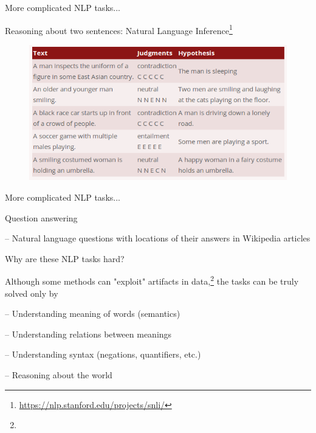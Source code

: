 \documentclass[12pt]{beamer}
\begin{document}
\begin{frame}{More complicated NLP tasks...}
	
Reasoning about two sentences: Natural Language Inference\footnote{\url{https://nlp.stanford.edu/projects/snli/}}

\begin{figure}
	\includegraphics[width=0.9\linewidth]{img/snli.png}
\end{figure}




\end{frame}


\begin{frame}{More complicated NLP tasks...}
	

	Question answering
	
	-- Natural language questions with locations of their answers in Wikipedia articles


	
\end{frame}

\begin{frame}{Why are these NLP tasks hard?}
	
Although some methods can "exploit" artifacts in data,\footnote{} the tasks can be truly solved only by

-- Understanding meaning of words (semantics)

-- Understanding relations between meanings

-- Understanding syntax (negations, quantifiers, etc.)

-- Reasoning about the world

	
\end{frame}
\end{document}
